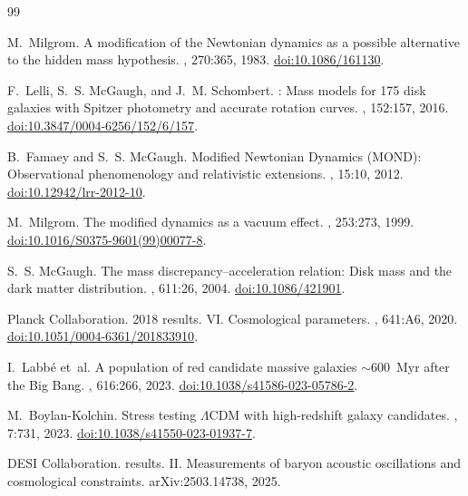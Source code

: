 \documentclass[11pt,a4paper]{article}
\numberwithin{equation}{section}
\numberwithin{table}{section}
\numberwithin{figure}{section}
\begin{document}
\begin{thebibliography}{99}

M.~Milgrom.
\newblock A modification of the {Newtonian} dynamics as a possible
  alternative to the hidden mass hypothesis.
, 270:365, 1983.
  \href{https://doi.org/10.1086/161130}{doi:10.1086/161130}.

F.~Lelli, S.~S. McGaugh, and J.~M. Schombert.
: Mass models for 175 disk galaxies with {Spitzer}
  photometry and accurate rotation curves.
, 152:157, 2016.
  \href{https://doi.org/10.3847/0004-6256/152/6/157}{doi:10.3847/0004-6256/152/6/157}.

B.~Famaey and S.~S. McGaugh.
\newblock Modified {Newtonian Dynamics (MOND)}: Observational
  phenomenology and relativistic extensions.
, 15:10, 2012.
  \href{https://doi.org/10.12942/lrr-2012-10}{doi:10.12942/lrr-2012-10}.

M.~Milgrom.
\newblock The modified dynamics as a vacuum effect.
, 253:273, 1999.
  \href{https://doi.org/10.1016/S0375-9601(99)00077-8}{doi:10.1016/S0375-9601(99)00077-8}.

S.~S. McGaugh.
\newblock The mass discrepancy--acceleration relation: Disk mass and
  the dark matter distribution.
, 611:26, 2004.
  \href{https://doi.org/10.1086/421901}{doi:10.1086/421901}.

{Planck Collaboration}.
 2018 results. {VI.} Cosmological parameters.
, 641:A6, 2020.
  \href{https://doi.org/10.1051/0004-6361/201833910}{doi:10.1051/0004-6361/201833910}.

I.~Labb{\'e} et~al.
\newblock A population of red candidate massive galaxies $\sim 600$~Myr
  after the {Big Bang}.
, 616:266, 2023.
  \href{https://doi.org/10.1038/s41586-023-05786-2}{doi:10.1038/s41586-023-05786-2}.

M.~Boylan-Kolchin.
\newblock Stress testing $\Lambda$CDM with high-redshift galaxy
  candidates.
, 7:731, 2023.
  \href{https://doi.org/10.1038/s41550-023-01937-7}{doi:10.1038/s41550-023-01937-7}.

{DESI Collaboration}.
 results. {II.} Measurements of baryon acoustic
  oscillations and cosmological constraints.
\newblock arXiv:2503.14738, 2025.


\end{thebibliography}
\end{document}
